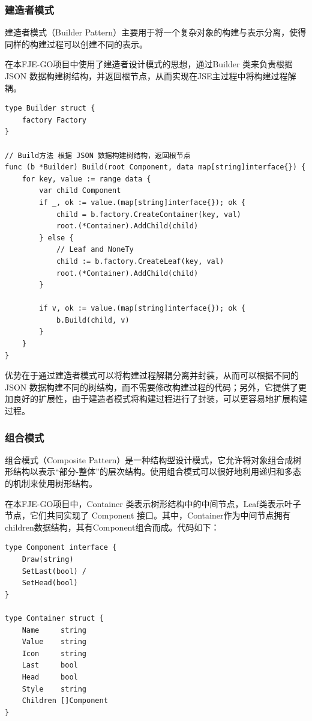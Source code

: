 \documentclass[hyperref,a4paper,UTF8]{ctexart}
\begin{document}
\subsubsection{建造者模式}

建造者模式（Builder Pattern）主要用于将一个复杂对象的构建与表示分离，使得同样的构建过程可以创建不同的表示。

在本FJE-GO项目中使用了建造者设计模式的思想，通过Builder 类来负责根据 JSON 数据构建树结构，并返回根节点，从而实现在JSE主过程中将构建过程解耦。

\begin{lstlisting}
type Builder struct {
	factory Factory
}

// Build方法 根据 JSON 数据构建树结构，返回根节点
func (b *Builder) Build(root Component, data map[string]interface{}) {
	for key, value := range data {
		var child Component
		if _, ok := value.(map[string]interface{}); ok {
			child = b.factory.CreateContainer(key, val)
			root.(*Container).AddChild(child)
		} else {
			// Leaf and NoneTy
			child := b.factory.CreateLeaf(key, val)
			root.(*Container).AddChild(child)
		}

		if v, ok := value.(map[string]interface{}); ok {
			b.Build(child, v)
		}
	}
}
\end{lstlisting}

优势在于通过建造者模式可以将构建过程解耦分离并封装，从而可以根据不同的 JSON 数据构建不同的树结构，而不需要修改构建过程的代码；另外，它提供了更加良好的扩展性，由于建造者模式将构建过程进行了封装，可以更容易地扩展构建过程。


\subsubsection{组合模式}
组合模式（Composite Pattern）是一种结构型设计模式，它允许将对象组合成树形结构以表示“部分-整体”的层次结构。使用组合模式可以很好地利用递归和多态的机制来使用树形结构。

在本FJE-GO项目中，Container 类表示树形结构中的中间节点，Leaf类表示叶子节点，它们共同实现了 Component 接口。其中，Container作为中间节点拥有children数据结构，其有Component组合而成。代码如下：

\begin{lstlisting}
type Component interface {
	Draw(string)
	SetLast(bool) /
	SetHead(bool)
}

type Container struct {
	Name     string
	Value    string
	Icon     string
	Last     bool 
	Head     bool
	Style    string
	Children []Component
}
\end{lstlisting}
\end{document}
